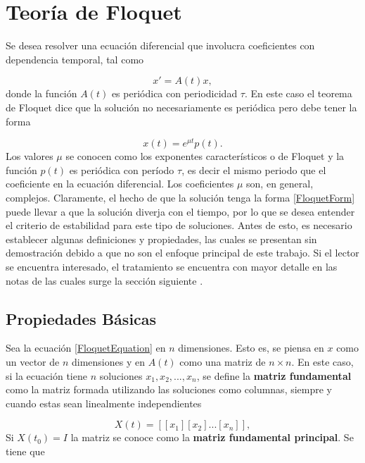 \documentclass[10pt,a4paper]{report}
\begin{document}
\section{Teoría de Floquet}

Se desea resolver una ecuación diferencial que involucra coeficientes con dependencia temporal, tal como

\begin{equation}\label{FloquetEquation}
x' = A(t)x,
\end{equation} donde la función $A(t)$ es periódica con periodicidad $\tau$. En este caso el teorema de Floquet\cite{WardFT} dice que la solución no necesariamente es periódica pero debe tener la forma

\begin{equation}\label{FloquetForm}
x(t)=e^{\mu t}p(t).
\end{equation} Los valores $\mu$ se conocen como los exponentes característicos o de Floquet y la función $p(t)$ es periódica con período $\tau$, es decir el mismo periodo que el coeficiente en la ecuación diferencial. Los coeficientes $\mu$ son, en general, complejos. Claramente, el hecho de que la solución tenga la forma \eqref{FloquetForm} puede llevar a que la solución diverja con el tiempo, por lo que se desea entender el criterio de estabilidad para este tipo de soluciones. Antes de esto, es necesario establecer algunas definiciones y propiedades, las cuales se presentan sin demostración debido a que no son el enfoque principal de este trabajo. Si el lector se encuentra interesado, el tratamiento se encuentra con mayor detalle en las notas de las cuales surge la sección siguiente \cite{WardFT}.

\subsection{Propiedades Básicas}

Sea la ecuación \eqref{FloquetEquation} en $n$ dimensiones. Esto es,
se piensa en $x$ como un vector de $n$ dimensiones y en $A(t)$ como
una matriz de $n \times n$. En este caso, si la ecuación tiene $n$
soluciones $x_1, x_2, ... , x_n$, se define la \textbf{matriz
  fundamental} como la matriz formada utilizando las soluciones como
columnas, siempre y cuando estas sean linealmente independientes

\begin{equation}
X(t) = [[x_1][x_2]...[x_n]],
\end{equation}Si $X(t_0) = I$ la matriz se conoce como la \textbf{matriz fundamental principal}. Se tiene que
\end{document}
